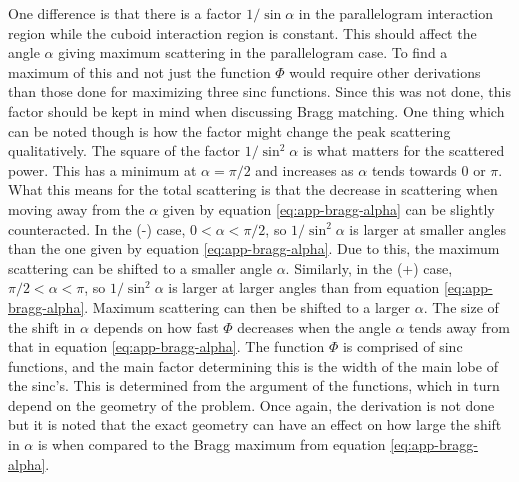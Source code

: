 \documentclass[11pt,twoside]{eitExjobb}
\begin{document}
One difference is that there is a factor $1/\sin{\alpha}$ in the parallelogram interaction region while the cuboid interaction region is constant. This should affect the angle $\alpha$ giving maximum scattering in the parallelogram case. To find a maximum of this and not just the function $\Phi$ would require other derivations than those done for maximizing three sinc functions. Since this was not done, this factor should be kept in mind when discussing Bragg matching. One thing which can be noted though is how the factor might change the peak scattering qualitatively. The square of the factor $1/\sin^2{\alpha}$ is what matters for the scattered power. This has a minimum at $\alpha = \pi/2$ and increases as $\alpha$ tends towards 0 or $\pi$. What this means for the total scattering is that the decrease in scattering when moving away from the $\alpha$ given by equation \eqref{eq:app-bragg-alpha} can be slightly counteracted. In the (-) case, $0 < \alpha < \pi/2$, so $1/\sin^2{\alpha}$ is larger at smaller angles than the one given by equation \eqref{eq:app-bragg-alpha}. Due to this, the maximum scattering can be shifted to a smaller angle $\alpha$. Similarly, in the (+) case, $\pi/2 < \alpha < \pi$, so $1/\sin^2{\alpha}$ is larger at larger angles than from equation \eqref{eq:app-bragg-alpha}. Maximum scattering can then be shifted to a larger $\alpha$. The size of the shift in $\alpha$ depends on how fast $\Phi$ decreases when the angle $\alpha$ tends away from that in equation \eqref{eq:app-bragg-alpha}. The function $\Phi$ is comprised of sinc functions, and the main factor determining this is the width of the main lobe of the sinc's. This is determined from the argument of the functions, which in turn depend on the geometry of the problem. Once again, the derivation is not done but it is noted that the exact geometry can have an effect on how large the shift in $\alpha$ is when compared to the Bragg maximum from equation \eqref{eq:app-bragg-alpha}.
	
\end{document}
